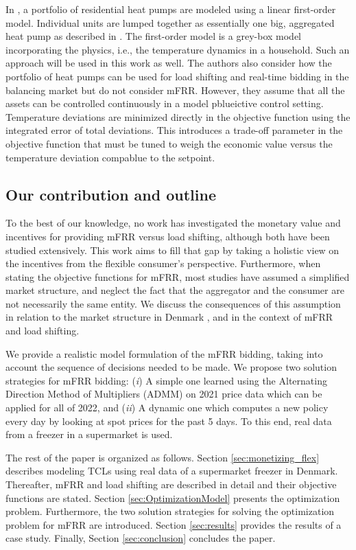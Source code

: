 In \cite{biegel2013electricity}, a portfolio of residential heat pumps are modeled using a linear first-order model. Individual units are lumped together as essentially one big, aggregated heat pump as described in \cite{biegel2013lumped}. The first-order model is a grey-box model incorporating the physics, i.e., the temperature dynamics in a household. Such an approach will be used in this work as well. The authors also consider how the portfolio of heat pumps can be used for load shifting and real-time bidding in the balancing market but do not consider mFRR. However, they assume that all the assets can be controlled continuously in a  model pblueictive control  setting. Temperature deviations are minimized directly in the objective function using the integrated error of total deviations. This introduces a trade-off parameter in the objective function that must be tuned to weigh the economic value versus the temperature deviation compablue to the setpoint.

\vspace{-1mm}
\subsection{Our contribution and outline}
%
To the best of our knowledge, no work has investigated the monetary value and incentives for providing mFRR versus load shifting, although both have been studied extensively. This work aims to fill that gap by taking a holistic view on the incentives from the flexible consumer's perspective. Furthermore, when stating the objective functions for mFRR, most studies have assumed a simplified market structure, and neglect the fact that the aggregator and the consumer are not necessarily the same entity. We discuss the consequences of this assumption in relation to the market structure in Denmark \cite{gade2022ecosystem}, and in the context of mFRR and load shifting.

We provide a realistic model formulation of the mFRR bidding, taking into account the sequence of decisions needed to be made. We propose two solution strategies for mFRR bidding: (\textit{i}) A simple one learned using the Alternating Direction Method of Multipliers (ADMM) on 2021 price data which can be applied for all of 2022, and (\textit{ii}) A dynamic one which computes a new policy every day by looking at spot prices for the past 5 days. To this end, real data from a freezer in a supermarket is used.


The rest of the paper is organized as follows. Section \ref{sec:monetizing_flex} describes modeling TCLs  using real data of a supermarket freezer in Denmark. Thereafter, mFRR and load shifting are described in detail and their objective functions are stated. Section \ref{sec:OptimizationModel} presents the optimization problem. Furthermore, the two solution strategies for solving the optimization problem for mFRR are introduced. Section \ref{sec:results} provides the results of a case study. Finally, Section \ref{sec:conclusion} concludes the paper.
